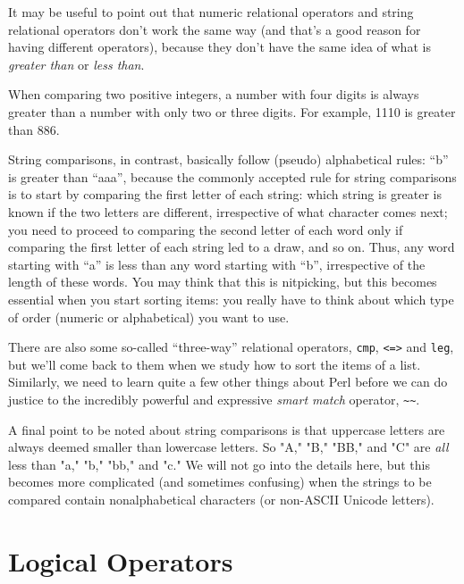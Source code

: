 It may be useful to point out that numeric relational operators 
and string relational operators don't work the same way (and 
that's a good reason for having different operators), because 
they don't have the same idea of what is \emph{greater than} 
or \emph{less than}.

When comparing two positive integers, a number with four digits
is always greater than a number with only two or three digits. 
For example, 1110 is greater than 886. 

String comparisons, in contrast, basically follow (pseudo) 
alphabetical rules: ``b'' is greater than ``aaa'', because 
the commonly accepted rule for string comparisons is to start 
by comparing the first letter of each string: which string 
is greater is known if the two letters are different, 
irrespective of what character comes next; you need to proceed 
to comparing the second letter of each word only if comparing 
the first letter of each string led to a draw, and so on. 
Thus, any word starting with ``a'' is less than any word 
starting with ``b'', irrespective of the length of these 
words. You may think that this is nitpicking, but this 
becomes essential when you start sorting items: you really 
have to think about which type of order (numeric or 
alphabetical) you want to use.

There are also some so-called ``three-way'' relational operators, 
{\tt cmp}, {\tt <=>} and {\tt leg}, but we'll come back to them 
when we study how to sort the items of a list. Similarly, we need 
to learn quite a few other things about Perl before we can do 
justice to the incredibly powerful and expressive \emph{smart match} 
operator, \verb"~~".
\ifplastex \else
{}
\fi

A final point to be noted about string comparisons is 
that uppercase letters are always deemed smaller 
than lowercase letters. So "A," "B," "BB," and "C" 
are \emph{all} less than "a," "b," "bb," and "c." We 
will not go into the details here, but this becomes 
more complicated (and sometimes confusing) when 
the strings to be compared contain nonalphabetical 
characters (or non-ASCII Unicode letters).

\section{Logical Operators}

